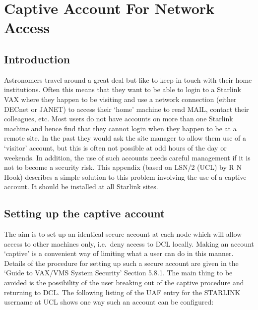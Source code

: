 \appendix

\section {Captive Account For Network Access}

\subsection {Introduction}

Astronomers travel around a great deal but like to keep in touch with their home
institutions.
Often this means that they want to be able to login to a Starlink VAX where they
happen to be visiting and use a network connection (either DECnet or JANET) to
access their `home' machine to read MAIL, contact their colleagues, etc.
Most users do not have accounts on more than one Starlink machine and hence find
that they cannot login when they happen to be at a remote site.
In the past they would ask the site manager to allow them use of a `visitor'
account, but this is often not possible at odd hours of the day or weekends.
In addition, the use of such accounts needs careful management if it is not to
become a security risk.
This appendix (based on LSN/2 (UCL) by R N Hook) describes a simple solution
to this problem involving the use of a captive account.
It should be installed at all Starlink sites.

\subsection {Setting up the captive account}

The aim is to set up an identical secure account at each node which will allow
access to other machines only, i.e.\ deny access to DCL locally.
Making an account `captive' is a convenient way of limiting what a user can do
in this manner.
Details of the procedure for setting up such a secure account are given in the
`Guide to VAX/VMS System Security' Section 5.8.1.
The main thing to be avoided is the possibility of the user breaking out of the
captive procedure and returning to DCL.
The following listing of the UAF entry for the STARLINK username at UCL shows
one way such an account can be configured:

\normalsize

